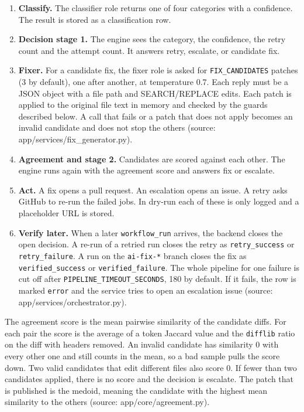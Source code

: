 \documentclass[11pt,a4paper]{report}
\begin{document}
\begin{enumerate}[leftmargin=*,itemsep=2pt]
\item \textbf{Classify.} The classifier role returns one of four categories with a confidence. The result is stored as a classification row.
\item \textbf{Decision stage 1.} The engine sees the category, the confidence, the retry count and the attempt count. It answers retry, escalate, or candidate fix.
\item \textbf{Fixer.} For a candidate fix, the fixer role is asked for \texttt{FIX\_\allowbreak{}CANDIDATES} patches (3 by default), one after another, at temperature 0.7. Each reply must be a JSON object with a file path and SEARCH/REPLACE edits. Each patch is applied to the original file text in memory and checked by the guards described below. A call that fails or a patch that does not apply becomes an invalid candidate and does not stop the others (source: app/services/fix\_generator.py).
\item \textbf{Agreement and stage 2.} Candidates are scored against each other. The engine runs again with the agreement score and answers fix or escalate.
\item \textbf{Act.} A fix opens a pull request. An escalation opens an issue. A retry asks GitHub to re-run the failed jobs. In dry-run each of these is only logged and a placeholder URL is stored.
\item \textbf{Verify later.} When a later \texttt{workflow\_\allowbreak{}run} arrives, the backend closes the open decision. A re-run of a retried run closes the retry as \texttt{retry\_\allowbreak{}success} or \texttt{retry\_\allowbreak{}failure}. A run on the \texttt{ai-\allowbreak{}fix-\allowbreak{}*} branch closes the fix as \texttt{verified\_\allowbreak{}success} or \texttt{verified\_\allowbreak{}failure}. The whole pipeline for one failure is cut off after \texttt{PIPELINE\_\allowbreak{}TIMEOUT\_\allowbreak{}SECONDS}, 180 by default. If it fails, the row is marked \texttt{error} and the service tries to open an escalation issue (source: app/services/orchestrator.py).
\end{enumerate}

The agreement score is the mean pairwise similarity of the candidate diffs. For each pair the score is the average of a token Jaccard value and the \texttt{difflib} ratio on the diff with headers removed. An invalid candidate has similarity 0 with every other one and still counts in the mean, so a bad sample pulls the score down. Two valid candidates that edit different files also score 0. If fewer than two candidates applied, there is no score and the decision is escalate. The patch that is published is the medoid, meaning the candidate with the highest mean similarity to the others (source: app/core/agreement.py).
\end{document}
